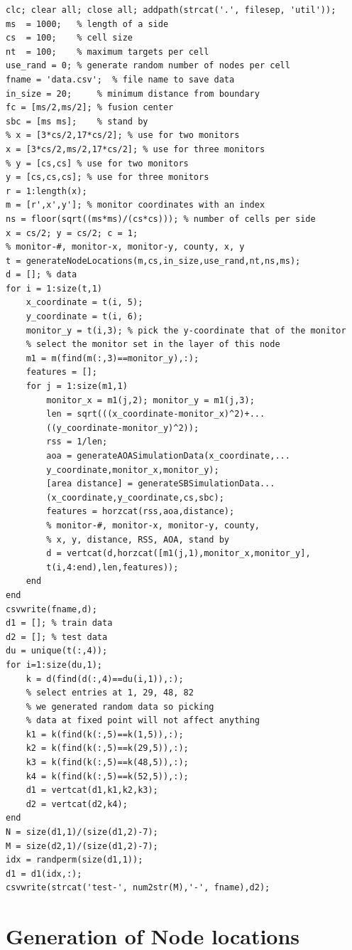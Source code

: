 \documentclass[12pt]{uthesis-v12}  %
\begin{document}
\begin{verbatim}
clc; clear all; close all; addpath(strcat('.', filesep, 'util'));
ms  = 1000;   % length of a side
cs  = 100;    % cell size
nt  = 100;    % maximum targets per cell
use_rand = 0; % generate random number of nodes per cell
fname = 'data.csv';  % file name to save data 
in_size = 20;     % minimum distance from boundary
fc = [ms/2,ms/2]; % fusion center
sbc = [ms ms];    % stand by   
% x = [3*cs/2,17*cs/2]; % use for two monitors
x = [3*cs/2,ms/2,17*cs/2]; % use for three monitors
% y = [cs,cs] % use for two monitors
y = [cs,cs,cs]; % use for three monitors
r = 1:length(x);
m = [r',x',y']; % monitor coordinates with an index 
ns = floor(sqrt((ms*ms)/(cs*cs))); % number of cells per side
x = cs/2; y = cs/2; c = 1;
% monitor-#, monitor-x, monitor-y, county, x, y
t = generateNodeLocations(m,cs,in_size,use_rand,nt,ns,ms);
d = []; % data
for i = 1:size(t,1)
    x_coordinate = t(i, 5);
    y_coordinate = t(i, 6);
    monitor_y = t(i,3); % pick the y-coordinate that of the monitor
    % select the monitor set in the layer of this node
    m1 = m(find(m(:,3)==monitor_y),:);
    features = [];
    for j = 1:size(m1,1)
        monitor_x = m1(j,2); monitor_y = m1(j,3);
        len = sqrt(((x_coordinate-monitor_x)^2)+...
        ((y_coordinate-monitor_y)^2)); 
        rss = 1/len;
        aoa = generateAOASimulationData(x_coordinate,...
        y_coordinate,monitor_x,monitor_y);      
        [area distance] = generateSBSimulationData...
        (x_coordinate,y_coordinate,cs,sbc);
        features = horzcat(rss,aoa,distance);   
        % monitor-#, monitor-x, monitor-y, county, 
        % x, y, distance, RSS, AOA, stand by
        d = vertcat(d,horzcat([m1(j,1),monitor_x,monitor_y],
        t(i,4:end),len,features));
    end
end
csvwrite(fname,d);
d1 = []; % train data
d2 = []; % test data
du = unique(t(:,4));
for i=1:size(du,1);
    k = d(find(d(:,4)==du(i,1)),:);
    % select entries at 1, 29, 48, 82 
    % we generated random data so picking
    % data at fixed point will not affect anything
    k1 = k(find(k(:,5)==k(1,5)),:);
    k2 = k(find(k(:,5)==k(29,5)),:);
    k3 = k(find(k(:,5)==k(48,5)),:);
    k4 = k(find(k(:,5)==k(52,5)),:);
    d1 = vertcat(d1,k1,k2,k3);    
    d2 = vertcat(d2,k4);
end
N = size(d1,1)/(size(d1,2)-7);
M = size(d2,1)/(size(d1,2)-7);
idx = randperm(size(d1,1));
d1 = d1(idx,:);
csvwrite(strcat('test-', num2str(M),'-', fname),d2);
\end{verbatim}

\section{Generation of Node locations}
\end{document}
